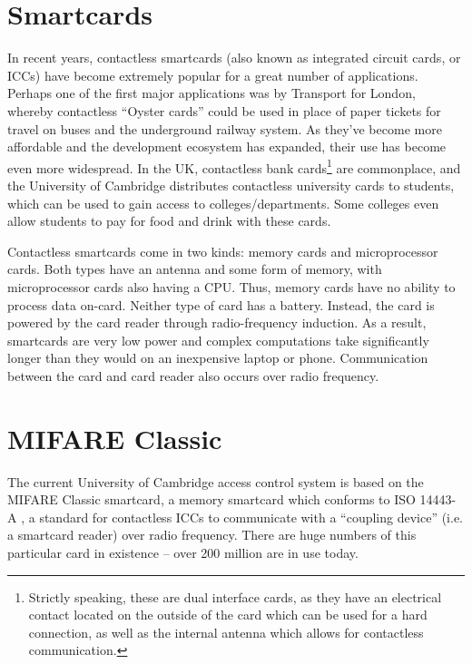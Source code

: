 \documentclass[12pt,a4paper,twoside,openright]{report}
\begin{document}
\section{Smartcards}

In recent years, contactless smartcards (also known as integrated circuit cards, or ICCs) have become extremely popular for a great number of applications. Perhaps one of the first major applications was by Transport for London, whereby contactless ``Oyster cards'' could be used in place of paper tickets for travel on buses and the underground railway system. As they've become more affordable and the development ecosystem has expanded, their use has become even more widespread. In the UK, contactless bank cards\footnote{Strictly speaking, these are dual interface cards, as they have an electrical contact located on the outside of the card which can be used for a hard connection, as well as the internal antenna which allows for contactless communication.} are commonplace, and the University of Cambridge distributes contactless university cards to students, which can be used to gain access to colleges/departments. Some colleges even allow students to pay for food and drink with these cards.

Contactless smartcards come in two kinds: memory cards and microprocessor cards. Both types have an antenna and some form of memory, with microprocessor cards also having a CPU. Thus, memory cards have no ability to process data on-card. Neither type of card has a battery. Instead, the card is powered by the card reader through radio-frequency induction. As a result, smartcards are very low power and complex computations take significantly longer than they would on an inexpensive laptop or phone. Communication between the card and card reader also occurs over radio frequency.

\section{MIFARE Classic}
\label{sec:mifareclassic}

The current University of Cambridge access control system is based on the MIFARE Classic smartcard, a memory smartcard which conforms to ISO 14443-A \cite{ISO14443}, a standard for contactless ICCs to communicate with a ``coupling device'' (i.e. a smartcard reader) over radio frequency. There are huge numbers of this particular card in existence -- over 200 million are in use today.
\end{document}
